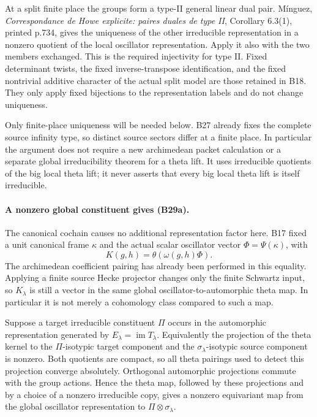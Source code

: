 \documentclass[11pt]{article}
\theoremstyle{definition}\newtheorem{definition}[theorem]{Definition}\newtheorem{remark}[theorem]{Remark}
\begin{document}
At a split finite place the groups form a type-II general
linear dual pair.  M\'inguez,
\emph{Correspondance de Howe explicite: paires duales de
type II}, Corollary 6.3(1), printed p.734, gives the
uniqueness of the other irreducible representation in
a nonzero quotient of the local oscillator representation.
Apply it also with the two members exchanged.  This is
the required injectivity for type II.  Fixed determinant
twists, the fixed inverse-transpose identification, and
the fixed nontrivial additive character of the actual
split model are those retained in B18.  They only apply
fixed bijections to the representation labels and do
not change uniqueness.

Only finite-place uniqueness will be needed below.
B27 already fixes the complete source infinity type,
so distinct source sectors differ at a finite place.
In particular the argument does not require a new
archimedean packet calculation or a separate global
irreducibility theorem for a theta lift.  It uses
irreducible quotients of the big local theta lift;
it never asserts that every big local theta lift is
itself irreducible.

\paragraph{A nonzero global constituent gives (B29a).}
The canonical cochain causes no additional representation
factor here.  B17 fixed a unit canonical frame $\kappa$
and the actual scalar oscillator vector
$\Phi=\Psi(\kappa)$, with
\[
   K(g,h)=\theta(\omega(g,h)\Phi).
 \tag{B29b}
\]
The archimedean coefficient pairing has already been
performed in this equality.  Applying a finite source
Hecke projector changes only the finite Schwartz input,
so $K_\lambda$ is still a vector in the same global
oscillator-to-automorphic theta map.  In particular it
is not merely a cohomology class compared to such a map.

Suppose a target irreducible constituent $\Pi$ occurs
in the automorphic representation generated by
$E_\lambda=\operatorname{im}T_\lambda$.
Equivalently the projection of the theta kernel to
the $\Pi$-isotypic target component and the
$\sigma_\lambda$-isotypic source component is nonzero.
Both quotients are compact, so all theta pairings used
to detect this projection converge absolutely.
Orthogonal automorphic projections commute with the
group actions.  Hence the theta map, followed by these
projections and by a choice of a nonzero irreducible
copy, gives a nonzero equivariant map from the global
oscillator representation to $\Pi\otimes\sigma_\lambda$.
\end{document}
